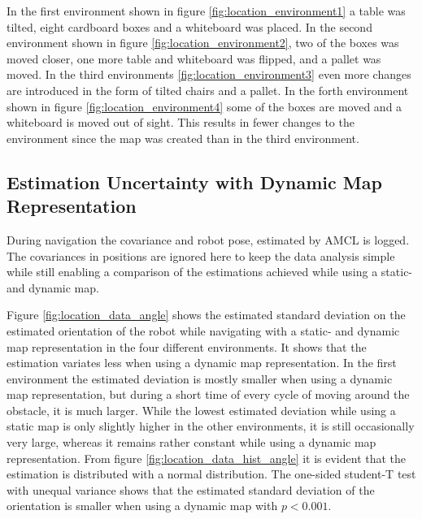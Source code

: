 In the first environment shown in figure \ref{fig:location_environment1} a table was tilted, eight cardboard boxes and a whiteboard was placed. 
In the second environment shown in figure \ref{fig:location_environment2}, two of the boxes was moved closer, one more table and whiteboard was flipped, and a pallet was moved. 
In the third environments \ref{fig:location_environment3} even more changes are introduced in the form of tilted chairs and a pallet. 
In the forth environment shown in figure \ref{fig:location_environment4} some of the boxes are moved and a whiteboard is moved out of sight. 
This results in fewer changes to the environment since the map was created than in the third environment.

\subsection{Estimation Uncertainty with Dynamic Map Representation}
During navigation the covariance and robot pose, estimated by AMCL is logged. 
The covariances in positions are ignored here to keep the data analysis simple while still enabling a comparison of the estimations achieved while using a static- and dynamic map.

Figure \ref{fig:location_data_angle} shows the estimated standard deviation on the estimated orientation of the robot while navigating with a static- and dynamic map representation in the four different environments.
It shows that the estimation variates less when using a dynamic map representation.
In the first environment the estimated deviation is mostly smaller when using a dynamic map representation, but during a short time of every cycle of moving around the obstacle, it is much larger. 
While the lowest estimated deviation while using a static map is only slightly higher in the other environments, it is still occasionally very large, whereas it remains rather constant while using a dynamic map representation. 
From figure \ref{fig:location_data_hist_angle} it is evident that the estimation is distributed with a normal distribution.
The one-sided student-T test with unequal variance shows that the estimated standard deviation of the orientation is smaller when using a dynamic map with $p < 0.001$.

